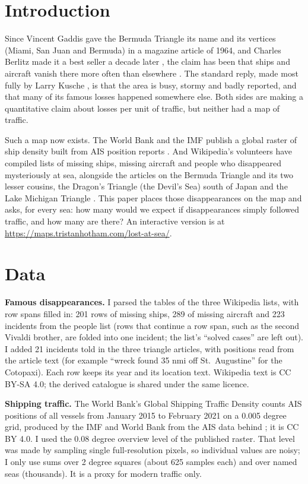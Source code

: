 \documentclass[11pt,a4paper]{article}
\begin{document}
\section{Introduction}
Since Vincent Gaddis gave the Bermuda Triangle its name and its vertices (Miami, San Juan and Bermuda) in a magazine article of 1964, and Charles Berlitz made it a best seller a decade later \citep{berlitz}, the claim has been that ships and aircraft vanish there more often than elsewhere \citep{wikibt}. The standard reply, made most fully by Larry Kusche \citep{kusche}, is that the area is busy, stormy and badly reported, and that many of its famous losses happened somewhere else. Both sides are making a quantitative claim about losses per unit of traffic, but neither had a map of traffic.

Such a map now exists. The World Bank and the IMF publish a global raster of ship density built from AIS position reports \citep{wbdensity,cerdeiro}. And Wikipedia's volunteers have compiled lists of missing ships, missing aircraft and people who disappeared mysteriously at sea, alongside the articles on the Bermuda Triangle and its two lesser cousins, the Dragon's Triangle (the Devil's Sea) south of Japan and the Lake Michigan Triangle \citep{wikimships,wikimair,wikipeople,wikids,wikilm}. This paper places those disappearances on the map and asks, for every sea: how many would we expect if disappearances simply followed traffic, and how many are there? An interactive version is at \url{https://maps.tristanhotham.com/lost-at-sea/}.

\section{Data}
\textbf{Famous disappearances.} I parsed the tables of the three Wikipedia lists, with row spans filled in: 201 rows of missing ships, 289 of missing aircraft and 223 incidents from the people list (rows that continue a row span, such as the second Vivaldi brother, are folded into one incident; the list's ``solved cases'' are left out). I added 21 incidents told in the three triangle articles, with positions read from the article text (for example ``wreck found 35 nmi off St.~Augustine'' for the Cotopaxi). Each row keeps its year and its location text. Wikipedia text is CC BY-SA 4.0; the derived catalogue is shared under the same licence.

\textbf{Shipping traffic.} The World Bank's Global Shipping Traffic Density \citep{wbdensity} counts AIS positions of all vessels from January 2015 to February 2021 on a 0.005 degree grid, produced by the IMF and World Bank from the AIS data behind \citet{cerdeiro}; it is CC BY 4.0. I used the 0.08 degree overview level of the published raster. That level was made by sampling single full-resolution pixels, so individual values are noisy; I only use sums over 2 degree squares (about 625 samples each) and over named seas (thousands). It is a proxy for modern traffic only.
\end{document}
